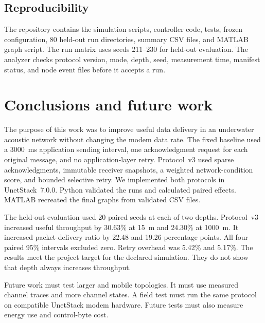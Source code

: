 \documentclass[11pt]{article}
\begin{document}
\subsection{Reproducibility}\label{sec:res-reproducibility}
\noindent
The repository contains the simulation scripts, controller code, tests, frozen configuration, 80 held-out run directories, summary CSV files, and MATLAB graph script.
The run matrix uses seeds 211--230 for held-out evaluation.
The analyzer checks protocol version, mode, depth, seed, measurement time, manifest status, and node event files before it accepts a run.

\section{Conclusions and future work}\label{sec:conclusion}
\noindent
The purpose of this work was to improve useful data delivery in an underwater acoustic network without changing the modem data rate.
The fixed baseline used a 3000~ms application sending interval, one acknowledgment request for each original message, and no application-layer retry.
Protocol~v3 used sparse acknowledgments, immutable receiver snapshots, a weighted network-condition score, and bounded selective retry.
We implemented both protocols in UnetStack~7.0.0.
Python validated the runs and calculated paired effects.
MATLAB recreated the final graphs from validated CSV files.

The held-out evaluation used 20 paired seeds at each of two depths.
Protocol~v3 increased useful throughput by 30.63\% at 15~m and 24.30\% at 1000~m.
It increased packet-delivery ratio by 22.48 and 19.26 percentage points.
All four paired 95\% intervals excluded zero.
Retry overhead was 5.42\% and 5.17\%.
The results meet the project target for the declared simulation.
They do not show that depth always increases throughput.

Future work must test larger and mobile topologies.
It must use measured channel traces and more channel states.
A field test must run the same protocol on compatible UnetStack modem hardware.
Future tests must also measure energy use and control-byte cost.
\end{document}
